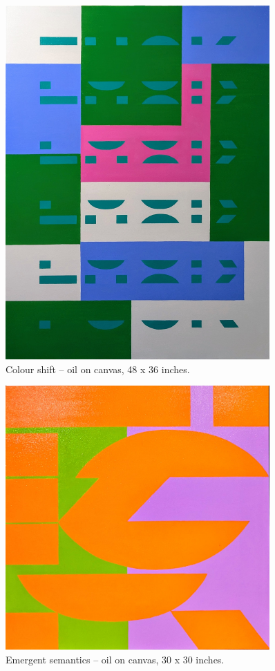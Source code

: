\documentclass[12pt]{article}
\begin{document}
\begin{figure}[htbp]
  \centering
  \includegraphics*[width=0.9\textwidth]{figures/green.jpg}
  \caption{Colour shift -- oil on canvas, 48 x 36 inches.}
  \label{fig:green}
\end{figure}

\begin{figure}[htbp]
  \centering
  \includegraphics*[width=0.9\textwidth]{figures/orange.jpg}
  \caption{Emergent semantics -- oil on canvas, 30 x 30 inches.}
  \label{fig:orange}
\end{figure}

\newpage
\printbibliography
\end{document}
